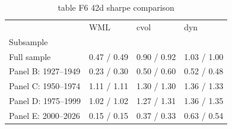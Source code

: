 \begin{table}[htbp]
  \centering
  \caption{table F6 42d sharpe comparison}
  \label{tab:table_F6_42d_sharpe_comparison}
  \begin{tabular}{llll}
\toprule
 & WML & cvol & dyn \\
Subsample &  &  &  \\
\midrule
Full sample & 0.47 / 0.49 & 0.90 / 0.92 & 1.03 / 1.00 \\
Panel B: 1927–1949 & 0.23 / 0.30 & 0.50 / 0.60 & 0.52 / 0.48 \\
Panel C: 1950–1974 & 1.11 / 1.11 & 1.30 / 1.30 & 1.36 / 1.33 \\
Panel D: 1975–1999 & 1.02 / 1.02 & 1.27 / 1.31 & 1.36 / 1.35 \\
Panel E: 2000–2026 & 0.15 / 0.15 & 0.37 / 0.33 & 0.63 / 0.54 \\
\bottomrule
\end{tabular}

\end{table}
